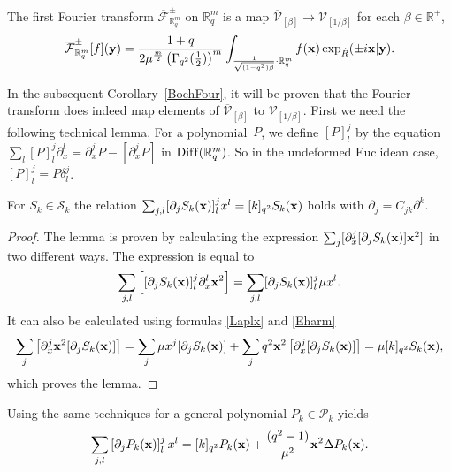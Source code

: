 \documentclass[pdftex]{sigma}
\newcommand{\mR}{\mathbb{R}}
\newcommand{\cF}{\mathcal{F}}
\newcommand{\cP}{\mathcal{P}}
\newcommand{\cS}{\mathcal{S}}
\newcommand{\cV}{\mathcal{V}}
\numberwithin{equation}{section}
\begin{document}
\begin{definition}
\label{defFour1}
The f\/irst Fourier transform $\overline{\cF}^{\pm}_{\mR^m_q}$ on $\mR^m_q$ is a map $\overline{\cV}_{[\beta]}\to\cV_{[1/\beta]}$ for each $\beta\in\mR^+$,
\begin{gather*}
\overline{\cF}^\pm_{\mR^m_q}[f](\bold{y}) = \frac{1+q}{2\mu^{\frac{m}{2}}\left(\Gamma_{q^2}(\frac{1}{2})\right)^{m}}\int_{\frac{1}{\sqrt{(1-q^2)\beta}}\cdot\mR^m_q}f(\bold{x})\exp_{\hat{R}}(\pm i\bold{x}|\bold{y}).
\end{gather*}
\end{definition}
In the subsequent Corollary~\ref{BochFour}, it will be proven that the Fourier transform does indeed map elements of $\overline{\cV}_{[\beta]}$ to $\cV_{[1/\beta]}$. First we need the following technical lemma. For a polynomial~$P$, we def\/ine $[P]^j_l$ by the equation $\sum_l [P]^j_l\partial_x^l=\partial_x^j P-\left[\partial^j_xP\right]$ in ${\rm Dif\/f}(\mR^m_q)$. So in the undeformed Euclidean case, $[P]^j_l=P\delta_l^j$.
\begin{lemma}\label{Svrexp}
For $S_k\in\cS_k$ the relation $\sum_{j,l}[\partial_jS_k(\bold{x})]^j_lx^l=[k]_{q^2}S_k(\bold{x})$ holds with $\partial_j=C_{jk}\partial^k$.
\end{lemma}

\begin{proof}
The lemma is proven by calculating the expression $\sum_j [\partial_x^j[\partial_jS_k(\bold{x})]\bold{x}^2 ]$ in two dif\/ferent ways. The expression is equal to
\begin{gather*}
\sum_{j,l}\left[[\partial_jS_k(\bold{x})]^j_l\partial_x^l\bold{x}^2\right] = \sum_{j,l}[\partial_jS_k(\bold{x})]^j_l\mu x^l.
\end{gather*}
It can also be calculated using formulas \eqref{Laplx} and \eqref{Eharm}
\begin{gather*}
\sum_j\left[\partial_x^j\bold{x}^2[\partial_jS_k(\bold{x})]\right] = \sum_j\mu x^j[\partial_jS_k(\bold{x})]+\sum_jq^2\bold{x}^2\left[\partial_x^j[\partial_jS_k(\bold{x})]\right]=\mu [k]_{q^2}S_k(\bold{x}),
\end{gather*}
which proves the lemma.
\end{proof}

\begin{remark}
Using the same techniques for a general polynomial $P_k\in\cP_k$ yields
\begin{gather*}
\sum_{j,l}\left[\partial_j P_k(\bold{x})\right]^j_lx^l=[k]_{q^2}P_k(\bold{x})+\frac{(q^2-1)}{\mu^2}\bold{x}^2\Delta P_k(\bold{x}).
\end{gather*}
\end{remark}
\end{document}
